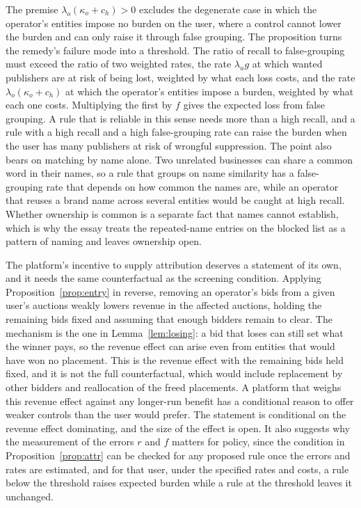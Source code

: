 \documentclass[11pt]{article}
\theoremstyle{definition}
\begin{document}
The premise $\lambda_o(\kappa_o+c_h)>0$ excludes the degenerate case in which the operator's entities impose no burden on the user, where a control cannot lower the burden and can only raise it through false grouping. The proposition turns the remedy's failure mode into a threshold. The ratio of recall to false-grouping must exceed the ratio of two weighted rates, the rate $\lambda_u g$ at which wanted publishers are at risk of being lost, weighted by what each loss costs, and the rate $\lambda_o(\kappa_o+c_h)$ at which the operator's entities impose a burden, weighted by what each one costs. Multiplying the first by $f$ gives the expected loss from false grouping. A rule that is reliable in this sense needs more than a high recall, and a rule with a high recall and a high false-grouping rate can raise the burden when the user has many publishers at risk of wrongful suppression. The point also bears on matching by name alone. Two unrelated businesses can share a common word in their names, so a rule that groups on name similarity has a false-grouping rate that depends on how common the names are, while an operator that reuses a brand name across several entities would be caught at high recall. Whether ownership is common is a separate fact that names cannot establish, which is why the essay treats the repeated-name entries on the blocked list as a pattern of naming and leaves ownership open.

The platform's incentive to supply attribution deserves a statement of its own, and it needs the same counterfactual as the screening condition. Applying Proposition~\ref{prop:entry} in reverse, removing an operator's bids from a given user's auctions weakly lowers revenue in the affected auctions, holding the remaining bids fixed and assuming that enough bidders remain to clear. The mechanism is the one in Lemma~\ref{lem:losing}: a bid that loses can still set what the winner pays, so the revenue effect can arise even from entities that would have won no placement. This is the revenue effect with the remaining bids held fixed, and it is not the full counterfactual, which would include replacement by other bidders and reallocation of the freed placements. A platform that weighs this revenue effect against any longer-run benefit has a conditional reason to offer weaker controls than the user would prefer. The statement is conditional on the revenue effect dominating, and the size of the effect is open. It also suggests why the measurement of the errors $r$ and $f$ matters for policy, since the condition in Proposition~\ref{prop:attr} can be checked for any proposed rule once the errors and rates are estimated, and for that user, under the specified rates and costs, a rule below the threshold raises expected burden while a rule at the threshold leaves it unchanged.
\end{document}
